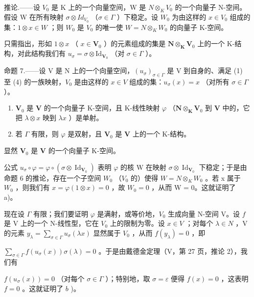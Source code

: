 推论.——设 \(V_{0}\) 是 K 上的一个向量空间，W 是 \(N \otimes_{K} V_{0}\) 的一个向量子 N-空间。假设 W 在所有映射 \(\sigma \otimes Id_{V_{0}}\) （\(\sigma \in \Gamma\) ）下稳定。设 \(W_{0}\) 为由这样的 \(x \in V_{0}\) 组成的集：\(1 \otimes x \in W\) ；则 \(W_{0}\) 是 \(V_{0}\) 的唯一使 \(W = N \otimes_{K} W_{0}\) 的向量子 K-空间。

只需指出，形如 \(1 \otimes x\) （ \(x \in \mathbf{V}_0\) ）的元素组成的集是 \(\mathbf{N} \otimes_{\mathbf{K}} \mathbf{V}_0\) 上的一个 K-结构，对此结构我们有 \(u_\sigma = \sigma \otimes \mathrm{Id}_{\mathbf{V}_0}\) （对 \(\sigma \in \Gamma\) ）。

命题 7.——设 V 是 N 上的一个向量空间，\((u_{\sigma})_{\sigma \in \Gamma}\) 是 V 到自身的、满足 (1) 至 (4) 的一族映射，\(V_{0}\) 是由这样的 \(x \in V\) 组成的集：\(u_{\sigma}(x) = x\) （对所有 \(\sigma \in \Gamma\) ）。

\begin{enumerate}
\def\labelenumi{\alph{enumi})}
\item
  \(\mathbf{V}_0\) 是 \(\mathbf{V}\) 的一个向量子 K-空间，且 K-线性映射 \(\varphi\) （\(\mathbf{N} \otimes_{\mathbf{K}} \mathbf{V}_0\) 到 \(\mathbf{V}\) 中的，它把 \(\lambda \otimes x\) 映到 \(\lambda x\) ）是单射。
\item
  若 \(\Gamma\) 有限，则 \(\varphi\) 是双射，且 \(\mathbf{V}_0\) 是 \(\mathbf{V}\) 上的一个 K-结构。
\end{enumerate}

显然 \(\mathbf{V}_0\) 是 \(\mathbf{V}\) 的一个向量子 K-空间。

公式 \(u_{\sigma} \circ \varphi = \varphi \circ (\sigma \otimes \operatorname{Id}_{\mathbf{V}_{0}})\) 表明 \(\varphi\) 的核 W 在映射 \(\sigma \otimes \operatorname{Id}_{\mathbf{V}_{0}}\) 下稳定；于是由命题 6 的推论，存在一个子空间 \(W_{0}\) （\(V_{0}\) 的）使得 \(W = N \otimes_{K} W_{0}\) 。若 x 属于 \(W_{0}\) ，则我们有 \(x = \varphi(1 \otimes x) = 0\) ，故 \(W_{0} = 0\) ，从而 W = 0。这就证明了 a)。

现在设 \(\Gamma\) 有限；我们要证明 \(\varphi\) 是满射，或等价地，\(V_0\) 生成向量 N-空间 V。设 \(f\) 是 V 上的一个 N-线性型，它在 \(V_0\) 上的限制为零。设 \(x \in V\) ；对每个 \(\lambda \in N\) ，V 的元素 \(y_\lambda = \sum_{\sigma \in \Gamma} u_\sigma(\lambda x)\) 显然属于 \(V_0\) ，从而 \(f(y_\lambda) = 0\) ，即

\(\sum_{\sigma \in \Gamma}f(u_{\sigma}(x))\sigma (\lambda) = 0\) 。于是由戴德金定理（V，第 27 页，推论 2），我们有

\(f(u_{\sigma}(x)) = 0\) （对每个 \(\sigma \in \Gamma\) ）；特别地，取 \(\sigma = \varepsilon\) 便得 \(f(x) = 0\) ，这表明 \(f = 0\) 。这就证明了 \(b\) )。

